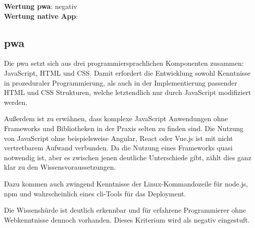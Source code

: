 \textbf{Wertung \ac{pwa}}: negativ\\
\textbf{Wertung native App}:  \\

\subsection{\ac{pwa}}
Die \ac{pwa} setzt sich aus drei programmiersprachlichen Komponenten zusammen: JavaScript, HTML und CSS. Damit erfordert die Entwicklung sowohl Kenntnisse in prozeduraler Programmierung, als auch in der Implementierung passender HTML und CSS Strukturen, welche letztendlich nur durch JavaScript modifiziert werden.

Außerdem ist zu erwähnen, dass komplexe JavaScript Anwendungen ohne Frameworks und Bibliotheken in der Praxis selten zu finden sind. Die Nutzung von JavaScript ohne beispielsweise Angular, React oder Vue.js ist mit nicht vertretbarem Aufwand verbunden. Da die Nutzung eines Frameworks quasi notwendig ist, aber es zwischen jenen deutliche Unterschiede gibt, zählt dies ganz klar zu den Wissensvoraussetzungen.

Dazu kommen auch zwingend Kenntnisse der Linux-Kommandozeile für node.js, npm und wahrscheinlich eines \ac{cli}-Tools für das Deployment.

Die Wissenshürde ist deutlich erkennbar und für erfahrene Programmierer ohne Webkenntnisse dennoch vorhanden. Dieses Kriterium wird als negativ eingestuft.  